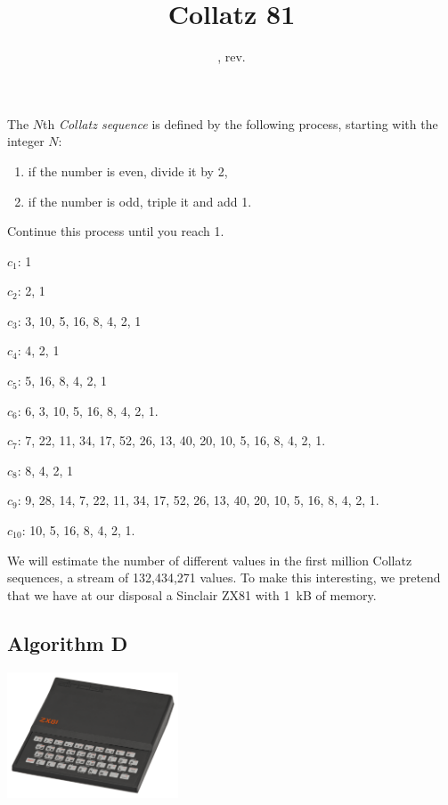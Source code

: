 \documentclass{tufte-handout}
\title{Collatz 81}
\date{\GITAuthorDate, rev. \GITAbrHash}
\author{}
\begin{document}
\maketitle




\bigskip\noindent
The $N$th \emph{Collatz sequence} is defined by the following process,
starting with the integer $N$:
\begin{enumerate}
\item if the number is even, divide it by 2,
\item if the number is odd, triple it and add 1.
\end{enumerate}
Continue this process until you reach 1.
\begin{marginfigure}
$c_1$: 1

\noindent $c_2$: 2, 1

\noindent $c_3$: 3, 10, 5, 16, 8, 4, 2, 1

\noindent $c_4$: 4, 2, 1

\noindent $c_5$: 5, 16, 8, 4, 2, 1

\noindent $c_6$: 6, 3, 10,
5, 16, 8, 4, 2, 1.

\noindent $c_7$: 7, 22, 11, 34, 17, 52, 26, 13, 40, 20, 10,
5, 16, 8, 4, 2, 1.

\noindent $c_8$: 8, 4, 2, 1

\noindent $c_9$: 9, 28, 14, 7, 22, 11, 34, 17, 52, 26, 13, 40, 20, 10,
5, 16, 8, 4, 2, 1.

\noindent $c_{10}$:  10,
5, 16, 8, 4, 2, 1.

\end{marginfigure}
\medskip
We will estimate the number of different values in the first million
Collatz sequences, a stream of 132,434,271 values.
To make this interesting, we pretend that we have at our disposal a
Sinclair ZX81 with 1~kB of memory.


\subsection{Algorithm D}

\begin{marginfigure}
\includegraphics[width=2in]{800px-Sinclair-ZX81.png}
\end{marginfigure}
\end{document}
